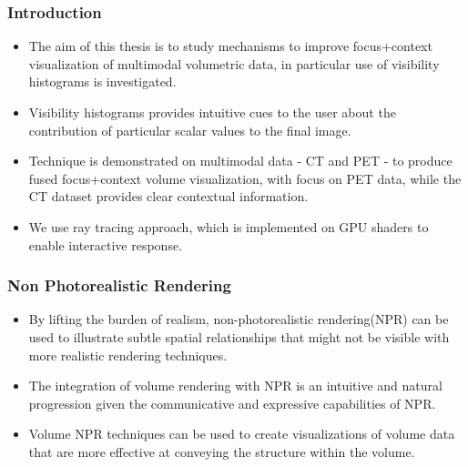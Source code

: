 \documentclass{beamer}
\begin{document}
\begin{frame}
\frametitle{Introduction}
\begin{itemize}
\item The aim of this thesis is to study mechanisms to improve focus+context visualization of multimodal volumetric data, in particular use of visibility histograms is investigated.
\item Visibility histograms provides intuitive cues to the user about the contribution of particular scalar values to the final image.
\item Technique is demonstrated on multimodal data - CT and PET - to produce fused focus+context volume visualization, with focus on PET data, while the CT dataset provides clear contextual information.
\item We use ray tracing approach, which is implemented on GPU shaders to enable interactive response.

\end{itemize}
\end{frame}


\begin{frame}
\frametitle{Non Photorealistic Rendering}
\begin{itemize}
\item By lifting the burden of realism, non-photorealistic rendering(NPR) can be used to illustrate subtle spatial relationships that might not be visible with more realistic rendering techniques.
\item The integration of volume rendering with NPR is an intuitive and natural progression given the communicative and expressive capabilities of NPR.
\item Volume NPR techniques can be used to create visualizations of volume data that are more effective at conveying the structure within the volume.
\end{itemize}
\end{frame}

\end{document}
